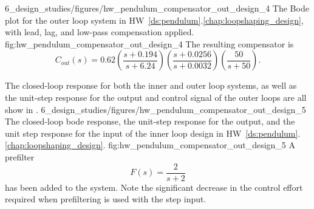 %
	{6_design_studies/figures/hw_pendulum_compensator_out_design_4}
	{The Bode plot for the outer loop system in HW~\ref{ds:pendulum}.\ref{chap:loopshaping_design}, with lead, lag, and low-pass compensation applied.}
	{fig:hw_pendulum_compensator_out_design_4}
%
The resulting compensator is
\[
C_{out}(s) = 0.62\left(\frac{s+0.194}{s+6.24}\right)\left(\frac{s+0.0256}{s+0.0032}\right)\left( \frac{50}{s+50} \right).
\]


The closed-loop response for both the inner and outer loop systems, 
as well as the unit-step response for the output and control signal of the outer loops are all show in .
	{6_design_studies/figures/hw_pendulum_compensator_out_design_5}
	{The closed-loop bode response, the unit-step response for the output, and the unit step response for the input of the inner loop design in HW~\ref{ds:pendulum}.\ref{chap:loopshaping_design}.}
	{fig:hw_pendulum_compensator_out_design_5}
A prefilter
\[
F(s) = \frac{2}{s+2}
\]
has been added to the system. Note the significant decrease in the control effort required when prefiltering is used with the step input.

